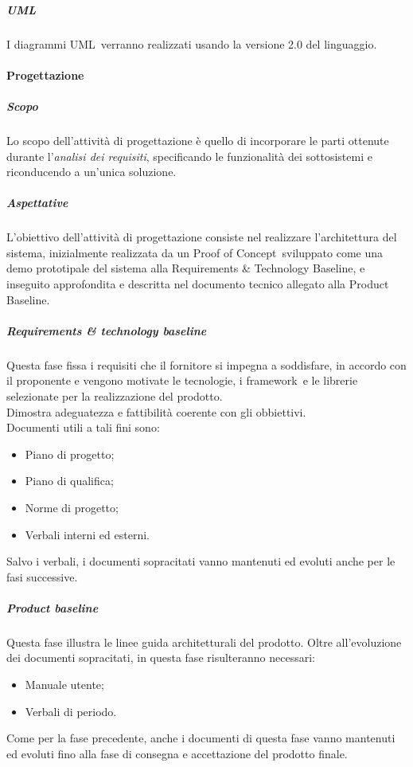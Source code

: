             \subparagraph{UML} \label{subparagraph:UML}
            I diagrammi UML\glo\ verranno realizzati usando la versione 2.0 del linguaggio.
          
        \paragraph{Progettazione} \label{paragraph:Progettazione}

            \subparagraph{Scopo} \label{subparagraph:Progettazione_Scopo}
            Lo scopo dell'attività di progettazione è quello di incorporare le parti ottenute durante l'\textit{analisi dei requisiti}, specificando le funzionalità dei sottosistemi
            e riconducendo a un’unica soluzione. 

            \subparagraph{Aspettative} \label{subparagraph:Progettazione_Aspettative}
            L’obiettivo dell’attività di progettazione consiste nel realizzare l’architettura del sistema, inizialmente realizzata da un Proof of Concept\glo\ sviluppato come
            una demo prototipale del sistema alla Requirements \& Technology Baseline, e inseguito approfondita e descritta nel documento tecnico allegato alla Product Baseline.

            \subparagraph{Requirements \& technology baseline} \label{subparagraph:Requirements & technology baseline}
            Questa fase fissa i requisiti che il fornitore si impegna a soddisfare, in accordo con il proponente e vengono motivate le tecnologie,
            i framework\glo\ e le librerie selezionate per la realizzazione del prodotto.\\
            Dimostra adeguatezza e fattibilità coerente con gli obbiettivi.\\
            Documenti utili a tali fini sono:
            \begin{itemize}
                \item Piano di progetto;
                \item Piano di qualifica;
                \item Norme di progetto;
                \item Verbali interni ed esterni.
            \end{itemize}
            Salvo i verbali, i documenti sopracitati vanno mantenuti ed evoluti anche per le fasi successive.\\


            \subparagraph{Product baseline} \label{subparagraph:Product baseline}
            Questa fase illustra le linee guida architetturali del prodotto.
            Oltre all'evoluzione dei documenti sopracitati, in questa fase risulteranno necessari:
            \begin{itemize}
                \item Manuale utente;
                \item Verbali di periodo.
            \end{itemize}
            Come per la fase precedente, anche i documenti di questa fase vanno mantenuti ed evoluti fino alla fase di consegna e accettazione del prodotto finale.

